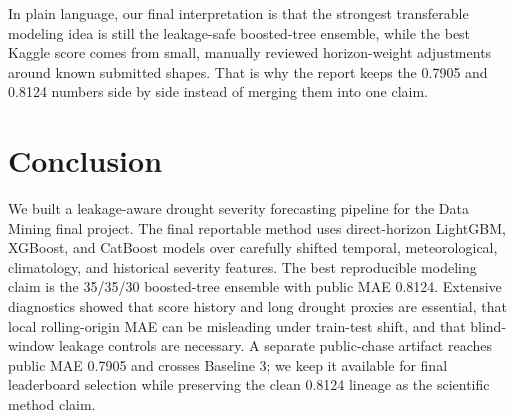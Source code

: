 \documentclass[conference]{IEEEtran}
\begin{document}
In plain language, our final interpretation is that the strongest transferable
modeling idea is still the leakage-safe boosted-tree ensemble, while the best
Kaggle score comes from small, manually reviewed horizon-weight adjustments
around known submitted shapes. That is why the report keeps the 0.7905 and
0.8124 numbers side by side instead of merging them into one claim.

\section{Conclusion}
We built a leakage-aware drought severity forecasting pipeline for the Data
Mining final project. The final reportable method uses direct-horizon
LightGBM, XGBoost, and CatBoost models over carefully shifted temporal,
meteorological, climatology, and historical severity features. The best
reproducible modeling claim is the 35/35/30 boosted-tree ensemble with public
MAE 0.8124. Extensive diagnostics showed that score history and long drought
proxies are essential, that local rolling-origin MAE can be misleading under
train-test shift, and that blind-window leakage controls are necessary. A
separate public-chase artifact reaches public MAE 0.7905 and crosses Baseline
3; we keep it available for final leaderboard selection while preserving the
clean 0.8124 lineage as the scientific method claim.



\end{document}
